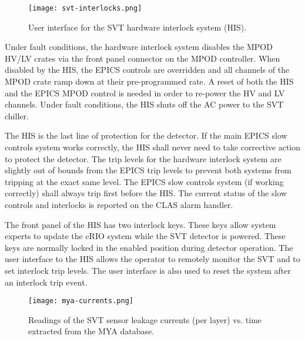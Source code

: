 \begin{figure}[hbt] 
\centering 
\texttt{[image: svt-interlocks.png]}
\caption{User interface for the SVT hardware interlock system (HIS).}
\label{fig:svt-interlocks}
\end{figure}

Under fault conditions, the hardware interlock system disables the MPOD HV/LV crates via the front panel connector on the MPOD controller. When disabled by the HIS, the EPICS controls are overridden and all channels of the MPOD crate ramp down at their pre-programmed rate. A reset of both the HIS and the EPICS MPOD control is needed in order to re-power the HV and LV channels. Under fault conditions, the HIS shuts off the AC power to the SVT chiller. 


The HIS is the last line of protection for the detector. If the main EPICS slow controls system works correctly, the HIS shall never need to take corrective action to protect the detector. The trip levels for the hardware interlock system are slightly out of bounds from the EPICS trip levels to prevent both systems from tripping at the exact same level. The EPICS slow controls system (if working correctly) shall always trip first before the HIS. The current status of the slow controls and interlocks is reported on the CLAS alarm handler. %

The front panel of the HIS has two interlock keys. These keys allow system experts to update the cRIO system while the SVT detector is powered. These keys are normally locked in the enabled position during detector operation.
The user interface to the HIS allows the operator to remotely monitor the SVT and to set interlock trip levels. The user interface is also used to reset the system after an interlock trip event. 

\begin{figure}[hbt] 
\centering 
\texttt{[image: mya-currents.png]}
\caption{Readings of the SVT sensor leakage currents (per layer) vs. time extracted from the MYA database.}
\label{fig:mya-currents}
\end{figure}

